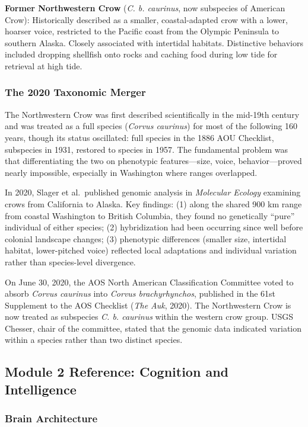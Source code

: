 \documentclass[11pt,letterpaper]{article}
\begin{document}
\textbf{Former Northwestern Crow} (\textit{C. b. caurinus}, now subspecies of American Crow): Historically described as a smaller, coastal-adapted crow with a lower, hoarser voice, restricted to the Pacific coast from the Olympic Peninsula to southern Alaska. Closely associated with intertidal habitats. Distinctive behaviors included dropping shellfish onto rocks and caching food during low tide for retrieval at high tide.

\subsubsection{The 2020 Taxonomic Merger}

The Northwestern Crow was first described scientifically in the mid-19th century and was treated as a full species (\textit{Corvus caurinus}) for most of the following 160 years, though its status oscillated: full species in the 1886 AOU Checklist, subspecies in 1931, restored to species in 1957. The fundamental problem was that differentiating the two on phenotypic features---size, voice, behavior---proved nearly impossible, especially in Washington where ranges overlapped.

In 2020, Slager et al.\ published genomic analysis in \textit{Molecular Ecology} examining crows from California to Alaska. Key findings: (1) along the shared 900 km range from coastal Washington to British Columbia, they found no genetically ``pure'' individual of either species; (2) hybridization had been occurring since well before colonial landscape changes; (3) phenotypic differences (smaller size, intertidal habitat, lower-pitched voice) reflected local adaptations and individual variation rather than species-level divergence.

On June 30, 2020, the AOS North American Classification Committee voted to absorb \textit{Corvus caurinus} into \textit{Corvus brachyrhynchos}, published in the 61st Supplement to the AOS Checklist (\textit{The Auk}, 2020). The Northwestern Crow is now treated as subspecies \textit{C. b. caurinus} within the western crow group. USGS Chesser, chair of the committee, stated that the genomic data indicated variation within a species rather than two distinct species.

\subsection{Module 2 Reference: Cognition and Intelligence}

\subsubsection{Brain Architecture}
\end{document}

